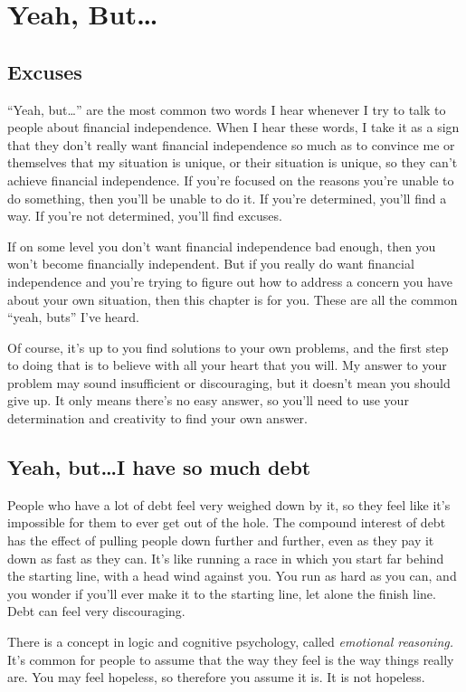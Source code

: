 \chapter{Yeah, But\ldots}

\section{Excuses}
``Yeah, but\ldots'' are the most common two words I hear whenever I try to talk to people about financial independence. When I hear these words, I take it as a sign that they don't really want financial independence so much as to convince me or themselves that my situation is unique, or their situation is unique, so they can't achieve financial independence. If you're focused on the reasons you're unable to do something, then you'll be unable to do it. If you're determined, you'll find a way. If you're not determined, you'll find excuses.

If on some level you don't want financial independence bad enough, then you won't become financially independent. But if you really do want financial independence and you're trying to figure out how to address a concern you have about your own situation, then this chapter is for you. These are all the common ``yeah, buts'' I've heard.

Of course, it's up to you find solutions to your own problems, and the first step to doing that is to believe with all your heart that you will. My answer to your problem may sound insufficient or discouraging, but it doesn't mean you should give up. It only means there's no easy answer, so you'll need to use your determination and creativity to find your own answer.

\section{Yeah, but\ldots I have so much debt}
People who have a lot of debt feel very weighed down by it, so they feel like it's impossible for them to ever get out of the hole. The compound interest of debt has the effect of pulling people down further and further, even as they pay it down as fast as they can. It's like running a race in which you start far behind the starting line, with a head wind against you. You run as hard as you can, and you wonder if you'll ever make it to the starting line, let alone the finish line. Debt can feel very discouraging.

There is a concept in logic and cognitive psychology, called \emph{emotional reasoning.} It's common for people to assume that the way they feel is the way things really are. You may feel hopeless, so therefore you assume it is. It is not hopeless.

